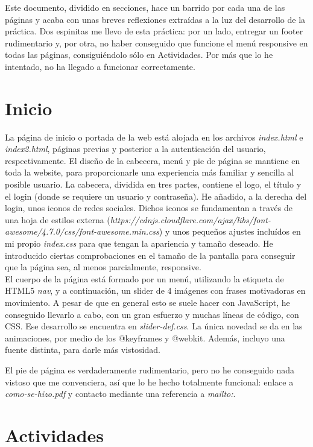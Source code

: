Este documento, dividido en secciones, hace un barrido por cada una de las páginas y acaba con unas breves reflexiones extraídas a la luz del desarrollo de la práctica. Dos espinitas me llevo de esta práctica: por un lado, entregar un footer rudimentario y, por otra, no haber conseguido que funcione el menú responsive en todas las páginas, consiguiéndolo sólo en Actividades. Por más que lo he intentado, no ha llegado a funcionar correctamente.
 
\section{Inicio}

La página de inicio o portada de la web está alojada en los archivos \textit{index.html} e \textit{index2.html}, páginas previas y posterior a la autenticación del usuario, respectivamente. El diseño de la cabecera, menú y pie de página se mantiene en toda la website, para proporcionarle una experiencia más familiar y sencilla al posible usuario. La cabecera, dividida en tres partes, contiene el logo, el título y el login (donde se requiere un usuario y contraseña). He añadido, a la derecha del login, unos iconos de redes sociales. Dichos iconos se fundamentan a través de una hoja de estilos externa (\textit{https://cdnjs.cloudflare.com/ajax/libs/font-awesome/4.7.0/css/font-awesome.min.css}) y unos pequeños ajustes incluídos en mi propio \textit{index.css} para que tengan la apariencia y tamaño deseado. He introducido ciertas comprobaciones en el tamaño de la pantalla para conseguir que la página sea, al menos parcialmente, responsive. \\

El cuerpo de la página está formado por un menú, utilizando la etiqueta de HTML5 \textit{nav}, y a continuación, un slider de 4 imágenes con frases motivadoras en movimiento. A pesar de que en general esto se suele hacer con JavaScript, he conseguido llevarlo a cabo, con un gran esfuerzo y muchas líneas de código, con CSS. Ese desarrollo se encuentra en \textit{slider-def.css}. La única novedad se da en las animaciones, por medio de los @keyframes y @webkit. Además, incluyo una fuente distinta, para darle más vistosidad.

El pie de página es verdaderamente rudimentario, pero no he conseguido nada vistoso que me convenciera, así que lo he hecho totalmente funcional: enlace a \textit{como-se-hizo.pdf} y contacto mediante una referencia a \textit{mailto:}.

\section{Actividades}

